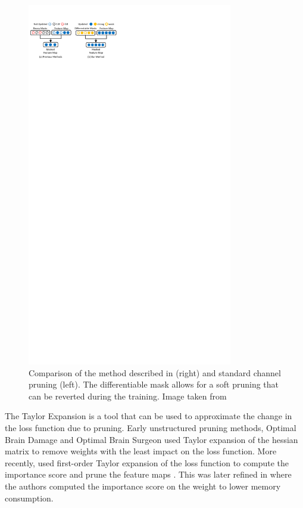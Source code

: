 \begin{figure}[htbp]
    \centering
    \includegraphics[width=0.8\textwidth,trim=0 0.4cm 0 0, clip]{chapter_sota/assets/operation_aware.pdf}
    \caption{Comparison of the method described in \cite{DBLP:conf/icml/KangH20}
    (right) and standard channel pruning (left). The differentiable mask allows
    for a soft pruning that can be reverted during the training. Image taken
    from \cite{DBLP:conf/icml/KangH20}}
    \label{fig:sota:operation_aware}
\end{figure}


The Taylor Expansion is a tool that can be used to approximate the change in the
loss function due to pruning. Early unstructured pruning methods, Optimal Brain
Damage \cite{DBLP:conf/nips/CunDS89} and Optimal Brain Surgeon
\cite{DBLP:conf/icnn/HassibiSW93} used Taylor expansion of the hessian matrix to
remove weights with the least impact on the loss function. More recently,
\citeauthor{DBLP:conf/iclr/MolchanovTKAK17} used first-order Taylor expansion of
the loss function to compute the importance score and prune the feature maps
\cite{DBLP:conf/iclr/MolchanovTKAK17}. This was later refined in
\cite{DBLP:conf/cvpr/MolchanovMTFK19} where the authors computed the importance
score on the weight to lower memory consumption.\\

